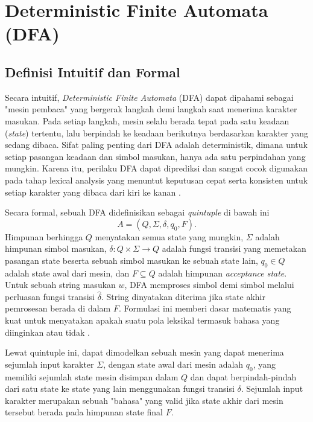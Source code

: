 \section{Deterministic Finite Automata (DFA)}

\subsection{Definisi Intuitif dan Formal}

Secara intuitif, \textit{Deterministic Finite Automata} (DFA) dapat dipahami sebagai "mesin pembaca" yang bergerak langkah demi langkah saat menerima karakter masukan. Pada setiap langkah, mesin selalu berada tepat pada satu keadaan (\textit{state}) tertentu, lalu berpindah ke keadaan berikutnya berdasarkan karakter yang sedang dibaca. Sifat paling penting dari DFA adalah deterministik, dimana untuk setiap pasangan keadaan dan simbol masukan, hanya ada satu perpindahan yang mungkin. Karena itu, perilaku DFA dapat diprediksi dan sangat cocok digunakan pada tahap lexical analysis yang menuntut keputusan cepat serta konsisten untuk setiap karakter yang dibaca dari kiri ke kanan \cite{hopcroft2006automata,sipser2012introduction}.

Secara formal, sebuah DFA didefinisikan sebagai \textit{quintuple} di bawah ini
\[A = (Q, \Sigma, \delta, q_0, F).\] Himpunan berhingga $Q$ menyatakan semua state yang mungkin, $\Sigma$ adalah himpunan simbol masukan, $\delta : Q \times \Sigma \rightarrow Q$ adalah fungsi transisi yang memetakan pasangan state beserta sebuah simbol masukan ke sebuah state lain, $q_0 \in Q$ adalah state awal dari mesin, dan $F \subseteq Q$ adalah himpunan \textit{acceptance state}. Untuk sebuah string masukan $w$, DFA memproses simbol demi simbol melalui perluasan fungsi transisi $\hat{\delta}$. String dinyatakan diterima jika state akhir pemrosesan berada di dalam $F$. Formulasi ini memberi dasar matematis yang kuat untuk menyatakan apakah suatu pola leksikal termasuk bahasa yang diinginkan atau tidak \cite{hopcroft2006automata,sipser2012introduction}.

Lewat quintuple ini, dapat dimodelkan sebuah mesin yang dapat menerima sejumlah input karakter $\Sigma$, dengan state awal dari mesin adalah $q_0$, yang memiliki sejumlah state mesin disimpan dalam $Q$ dan dapat berpindah-pindah dari satu state ke state yang lain menggunakan fungsi transisi $\delta$. Sejumlah input karakter merupakan sebuah "bahasa" yang valid jika state akhir dari mesin tersebut berada pada himpunan state final $F$.

